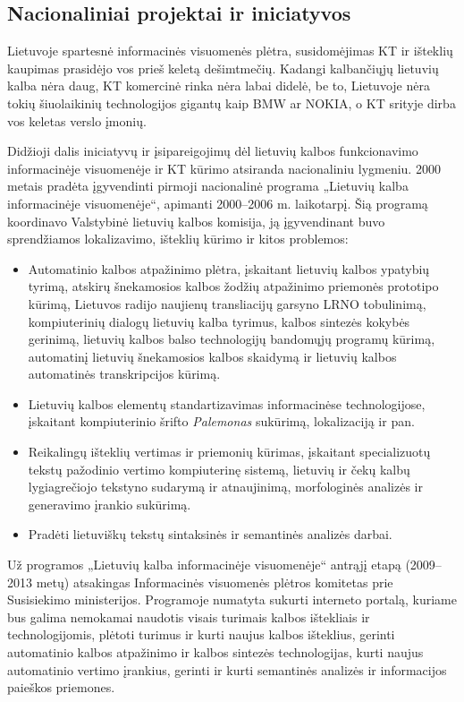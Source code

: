 \begin{multicols}{2}
\subsection{Nacionaliniai projektai ir iniciatyvos}

 Lietuvoje spartesnė informacinės visuomenės plėtra, susidomėjimas KT ir išteklių kaupimas prasidėjo vos prieš keletą dešimtmečių. Kadangi kalbančiųjų lietuvių kalba nėra daug, KT komercinė rinka nėra labai didelė, be to, Lietuvoje nėra tokių šiuolaikinių technologijos gigantų kaip BMW ar NOKIA, o KT srityje dirba vos keletas verslo įmonių.  

Didžioji dalis iniciatyvų ir įsipareigojimų dėl lietuvių kalbos funkcionavimo informacinėje visuomenėje ir KT kūrimo atsiranda nacionaliniu lygmeniu. 2000 metais pradėta įgyvendinti pirmoji nacionalinė programa „Lietuvių kalba informacinėje visuomenėje“, apimanti 2000–2006 m. laikotarpį. Šią programą koordinavo Valstybinė lietuvių kalbos komisija, ją įgyvendinant buvo sprendžiamos lokalizavimo, išteklių kūrimo ir kitos problemos:
\begin{itemize}
      \item Automatinio kalbos atpažinimo plėtra, įskaitant lietuvių kalbos ypatybių tyrimą, atskirų šnekamosios kalbos žodžių atpažinimo priemonės prototipo kūrimą, Lietuvos radijo naujienų transliacijų garsyno LRNO tobulinimą, kompiuterinių dialogų lietuvių kalba tyrimus, kalbos sintezės kokybės gerinimą, lietuvių kalbos balso technologijų bandomųjų programų kūrimą, automatinį lietuvių šnekamosios kalbos skaidymą ir lietuvių kalbos automatinės transkripcijos kūrimą.
      \item Lietuvių kalbos elementų standartizavimas informacinėse technologijose, įskaitant kompiuterinio šrifto \textit{Palemonas} sukūrimą, lokalizaciją ir pan.
      \item Reikalingų išteklių vertimas ir priemonių kūrimas, įskaitant specializuotų tekstų pažodinio vertimo kompiuterinę sistemą, lietuvių ir čekų kalbų lygiagrečiojo tekstyno sudarymą ir atnaujinimą, morfologinės analizės ir generavimo įrankio sukūrimą.
      \item Pradėti lietuviškų tekstų sintaksinės ir semantinės analizės darbai. 
          \end{itemize}

    Už programos „Lietuvių kalba informacinėje visuomenėje“ antrąjį etapą (2009–2013 metų) atsakingas Informacinės visuomenės plėtros komitetas prie Susisiekimo ministerijos. Programoje numatyta sukurti interneto portalą, kuriame bus galima nemokamai naudotis visais turimais kalbos ištekliais ir technologijomis, plėtoti turimus ir kurti naujus kalbos išteklius, gerinti automatinio kalbos atpažinimo ir kalbos sintezės technologijas, kurti naujus automatinio vertimo įrankius, gerinti ir kurti semantinės analizės ir informacijos paieškos priemones.


\end{multicols}
